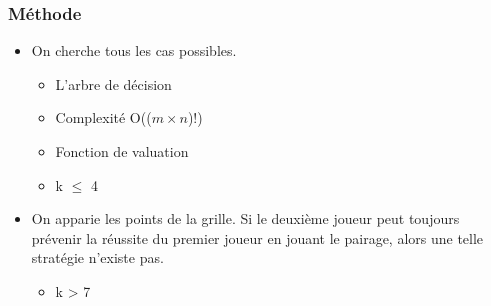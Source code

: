 \documentclass{beamer}
\begin{document}
\begin{frame}
    \frametitle{Méthode}
    \begin{itemize}[<+->]
        \item On cherche tous les cas possibles.
            \begin{itemize}[<+->]
                \item L'arbre de décision
                \item Complexité O(($m \times n$)!)
                \item{Fonction de valuation}
                \item k $\le$ 4
            \end{itemize}
        \item On apparie les points de la grille. Si le deuxième joueur peut toujours prévenir la réussite du premier joueur en jouant le pairage, alors une telle stratégie n'existe pas.
            \begin{itemize}[<+->]
                \item k > 7
            \end{itemize}

    \end{itemize}
    \cleargoban
\end{frame}
\end{document}
